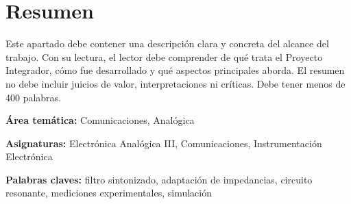 \chapter*{Resumen}

Este apartado debe contener una descripción clara y concreta del alcance del trabajo. Con su lectura, el lector debe comprender de qué trata el Proyecto Integrador, cómo fue desarrollado y qué aspectos principales aborda. El resumen no debe incluir juicios de valor, interpretaciones ni críticas. Debe tener menos de 400 palabras.

\vspace{1cm}

\noindent\textbf{Área temática:} Comunicaciones, Analógica

\vspace{0.5cm}

\noindent\textbf{Asignaturas:} Electrónica Analógica III, Comunicaciones, Instrumentación Electrónica

\vspace{0.5cm}

\noindent\textbf{Palabras claves:} filtro sintonizado, adaptación de impedancias, circuito resonante, mediciones experimentales, simulación